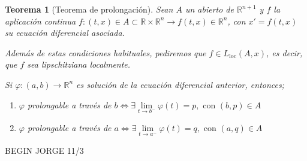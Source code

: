 \documentclass{article}
\theoremstyle{theorem-style}  %
\newtheorem{theorem}{Teorema}[section]  %
\theoremstyle{definition-style}
\theoremstyle{example-style}
\begin{document}
\begin{theorem}[Teorema de prolongación]
	Sean $ A $ un abierto de $ \mathbb{R}^{n+1} $ y $ f $ la aplicación continua $ f:(t,x)\in A\subset \mathbb{R}\times \mathbb{R}^n \longrightarrow f(t,x)\in \mathbb{R}^n $, con $  x'=f(t,x) $ su ecuación diferencial asociada. 
	
	Además de estas condiciones habituales, pediremos que $ f\in L_{\text{loc}}(A,x) $, es decir, que $ f $ sea lipschitziana localmente.
	
	Si $ \varphi:(a,b)\longrightarrow\mathbb{R}^n $ es solución de la ecuación diferencial anterior, entonces;
	\begin{enumerate}[\quad i)]
		\item $ \varphi $ prolongable a través de $ b \Leftrightarrow \exists \lim\limits_{t\to b^-}\varphi(t)=p, \text{ con } (b,p) \in A $
		\item $ \varphi $ prolongable a través de $ a \Leftrightarrow \exists \lim\limits_{t\to a^-}\varphi(t)=q, \text{ con } (a,q) \in A $
	\end{enumerate}
\end{theorem}

BEGIN JORGE 11/3
\end{document}
